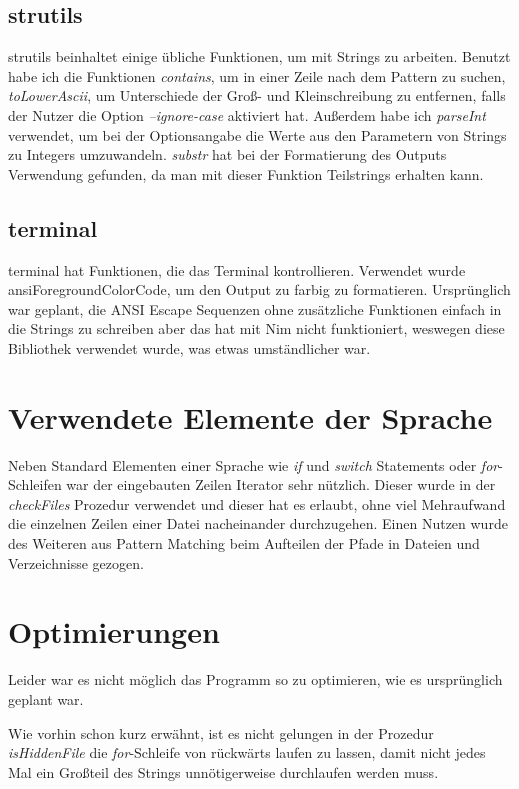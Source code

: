 \documentclass[11pt]{report}
\begin{document}
\subsection{strutils}
strutils beinhaltet einige übliche Funktionen, um mit Strings zu arbeiten.
Benutzt habe ich die Funktionen \emph{contains}, um in einer Zeile nach dem Pattern zu suchen, \emph{toLowerAscii}, um Unterschiede der Groß- und Kleinschreibung zu entfernen, falls der Nutzer die Option \emph{--ignore-case} aktiviert hat. Außerdem habe ich \emph{parseInt} verwendet, um bei der Optionsangabe die Werte aus den Parametern von Strings zu Integers umzuwandeln.
\emph{substr} hat bei der Formatierung des Outputs Verwendung gefunden, da man mit dieser Funktion Teilstrings erhalten kann.
\subsection{terminal}
terminal hat Funktionen, die das Terminal kontrollieren.
Verwendet wurde ansiForegroundColorCode, um den Output zu farbig zu formatieren. Ursprünglich war geplant, die ANSI Escape Sequenzen ohne zusätzliche Funktionen einfach in die Strings zu schreiben aber das hat mit Nim nicht funktioniert, weswegen diese Bibliothek verwendet wurde, was etwas umständlicher war.

\section{Verwendete Elemente der Sprache}
Neben Standard Elementen einer Sprache wie \emph{if} und \emph{switch} Statements oder \emph{for}-Schleifen war der eingebauten Zeilen Iterator sehr nützlich. Dieser wurde in der \emph{checkFiles} Prozedur verwendet und dieser hat es erlaubt, ohne viel Mehraufwand die einzelnen Zeilen einer Datei nacheinander durchzugehen.
Einen Nutzen wurde des Weiteren aus Pattern Matching beim Aufteilen der Pfade in Dateien und Verzeichnisse gezogen.

\section{Optimierungen}
Leider war es nicht möglich das Programm so zu optimieren, wie es ursprünglich geplant war.


Wie vorhin schon kurz erwähnt, ist es nicht gelungen in der Prozedur \emph{isHiddenFile} die \emph{for}-Schleife von rückwärts laufen zu lassen, damit nicht jedes Mal ein Großteil des Strings unnötigerweise durchlaufen werden muss.
\end{document}
